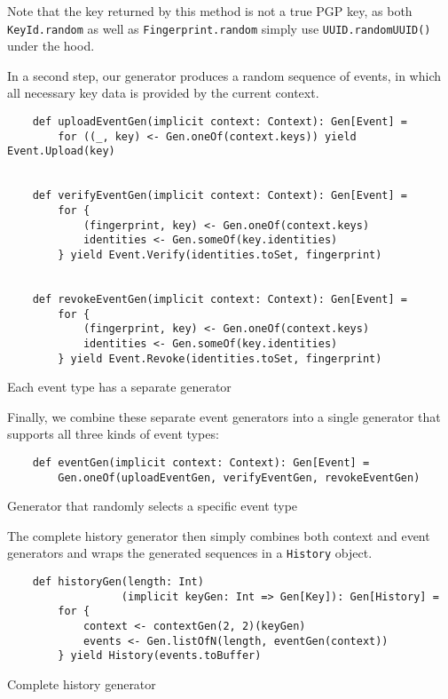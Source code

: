Note that the key returned by this method is not a true PGP key, as both \texttt{KeyId.random} as well as \texttt{Fingerprint.random} simply use \texttt{UUID.randomUUID()} under the hood. 

In a second step, our generator produces a random sequence of events, in which all necessary key data is provided by the current context.
\begin{code}
    \begin{verbatim}
    def uploadEventGen(implicit context: Context): Gen[Event] =
        for ((_, key) <- Gen.oneOf(context.keys)) yield Event.Upload(key)


    def verifyEventGen(implicit context: Context): Gen[Event] =
        for {
            (fingerprint, key) <- Gen.oneOf(context.keys)
            identities <- Gen.someOf(key.identities)
        } yield Event.Verify(identities.toSet, fingerprint)


    def revokeEventGen(implicit context: Context): Gen[Event] =
        for {
            (fingerprint, key) <- Gen.oneOf(context.keys)
            identities <- Gen.someOf(key.identities)
        } yield Event.Revoke(identities.toSet, fingerprint)
    \end{verbatim}
    \caption{Each event type has a separate generator}
\end{code}


Finally, we combine these separate event generators into a single generator that supports all three kinds of event types:
\begin{code}
    \begin{verbatim}
    def eventGen(implicit context: Context): Gen[Event] =
        Gen.oneOf(uploadEventGen, verifyEventGen, revokeEventGen)
    \end{verbatim}
    \caption{Generator that randomly selects a specific event type}
\end{code}


The complete history generator then simply combines both context and event generators and wraps the generated sequences in a \texttt{History} object.
\begin{code}
    \begin{verbatim}
    def historyGen(length: Int)
                  (implicit keyGen: Int => Gen[Key]): Gen[History] =
        for {
            context <- contextGen(2, 2)(keyGen)
            events <- Gen.listOfN(length, eventGen(context))
        } yield History(events.toBuffer)
    \end{verbatim}
    \caption{Complete history generator}
\end{code}

